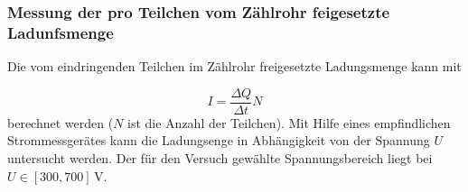 \subsubsection{Messung der pro Teilchen vom Zählrohr feigesetzte Ladunfsmenge}
Die vom eindringenden Teilchen im Zählrohr freigesetzte Ladungsmenge kann mit

\begin{equation}
  \label{eq:lafung_pro_teilchen}
  I=\frac{\Delta Q}{\Delta t} N
\end{equation}
berechnet werden ($N$ ist die Anzahl der Teilchen).
Mit Hilfe eines empfindlichen Strommessgerätes
kann die Ladungsenge in Abhängigkeit von der Spannung $U$ untersucht werden.
Der für den Versuch gewählte Spannungsbereich liegt bei $U\in\left[300, 700\right] \, \si{\volt}$.
